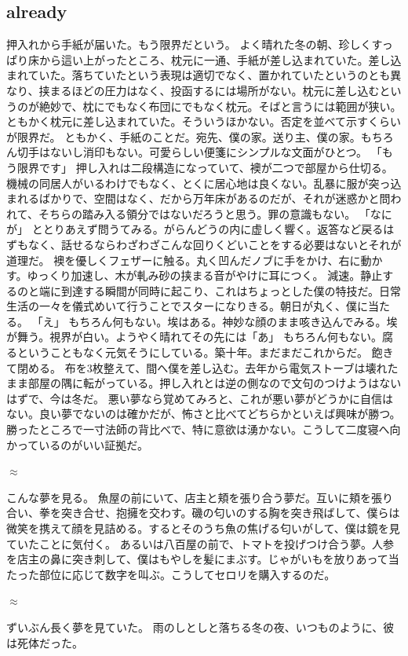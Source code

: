 \subsection{already}
押入れから手紙が届いた。もう限界だという。
よく晴れた冬の朝、珍しくすっぱり床から這い上がったところ、枕元に一通、手紙が差し込まれていた。差し込まれていた。落ちていたという表現は適切でなく、置かれていたというのとも異なり、挟まるほどの圧力はなく、投函するには場所がない。枕元に差し込むというのが絶妙で、枕にでもなく布団にでもなく枕元。そばと言うには範囲が狭い。ともかく枕元に差し込まれていた。そういうほかない。否定を並べて示すくらいが限界だ。
ともかく、手紙のことだ。宛先、僕の家。送り主、僕の家。もちろん切手はないし消印もない。可愛らしい便箋にシンプルな文面がひとつ。
「もう限界です」
押し入れは二段構造になっていて、襖が二つで部屋から仕切る。機械の同居人がいるわけでもなく、とくに居心地は良くない。乱暴に服が突っ込まれるばかりで、空間はなく、だから万年床があるのだが、それが迷惑かと問われて、そちらの踏み入る領分ではないだろうと思う。罪の意識もない。
「なにが」
ととりあえず問うてみる。がらんどうの内に虚しく響く。返答など戻るはずもなく、話せるならわざわざこんな回りくどいことをする必要はないとそれが道理だ。
襖を優しくフェザーに触る。丸く凹んだノブに手をかけ、右に動かす。ゆっくり加速し、木が軋み砂の挟まる音がやけに耳につく。
減速。静止するのと端に到達する瞬間が同時に起こり、これはちょっとした僕の特技だ。日常生活の一々を儀式めいて行うことでスターになりきる。朝日が丸く、僕に当たる。
「え」
もちろん何もない。埃はある。神妙な顔のまま咳き込んでみる。埃が舞う。視界が白い。ようやく晴れてその先には「あ」
もちろん何もない。腐るということもなく元気そうにしている。築十年。まだまだこれからだ。
飽きて閉める。
布を3枚整えて、間へ僕を差し込む。去年から電気ストーブは壊れたまま部屋の隅に転がっている。押し入れとは逆の側なので文句のつけようはないはずで、今は冬だ。
悪い夢なら覚めてみろと、これが悪い夢がどうかに自信はない。良い夢でないのは確かだが、怖さと比べてどちらかといえば興味が勝つ。勝ったところで一寸法師の背比べで、特に意欲は湧かない。こうして二度寝へ向かっているのがいい証拠だ。

\begin{center}
$\approx$
\end{center}

こんな夢を見る。
魚屋の前にいて、店主と頬を張り合う夢だ。互いに頬を張り合い、拳を突き合せ、抱擁を交わす。磯の匂いのする胸を突き飛ばして、僕らは微笑を携えて顔を見詰める。するとそのうち魚の焦げる匂いがして、僕は鏡を見ていたことに気付く。
あるいは八百屋の前で、トマトを投げつけ合う夢。人参を店主の鼻に突き刺して、僕はもやしを髪にまぶす。じゃがいもを放りあって当たった部位に応じて数字を叫ぶ。こうしてセロリを購入するのだ。

\begin{center}
$\approx$
\end{center}

ずいぶん長く夢を見ていた。
雨のしとしと落ちる冬の夜、いつものように、彼は死体だった。